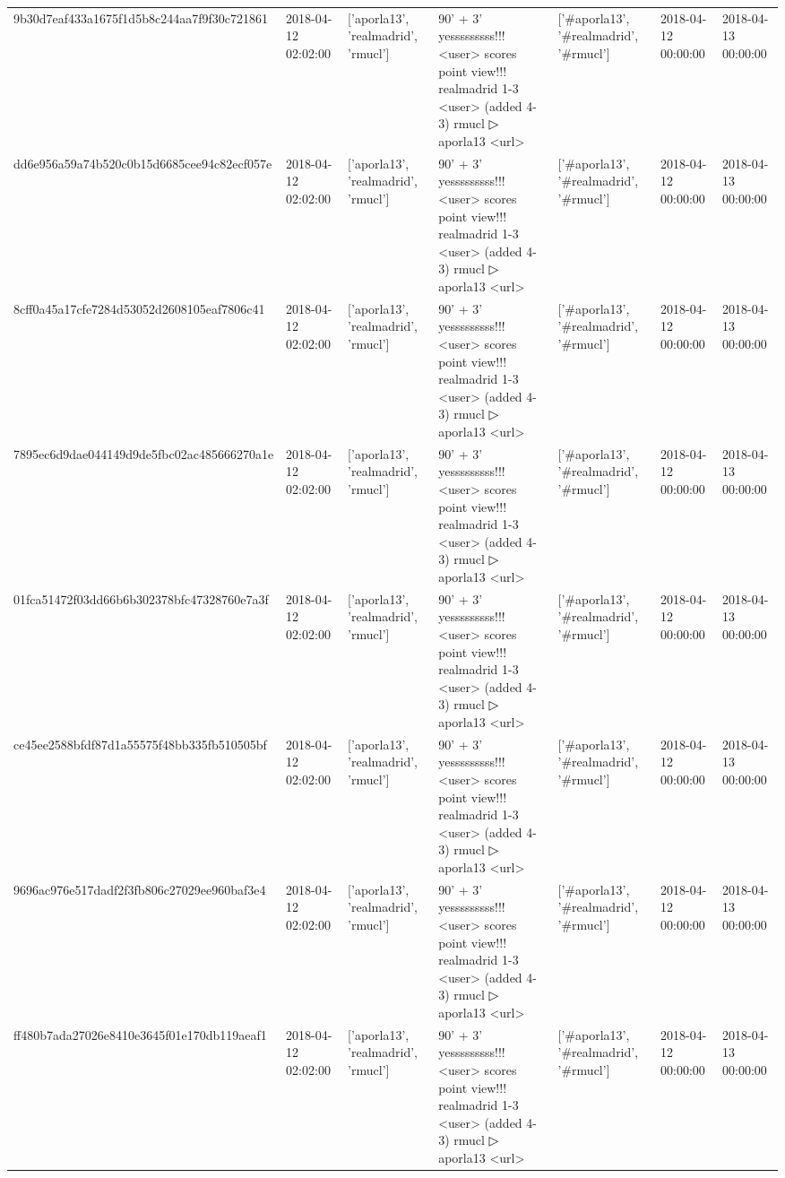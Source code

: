 \begin{tabular}{lllllll}
9b30d7eaf433a1675f1d5b8c244aa7f9f30c721861 & 2018-04-12 02:02:00 & ['aporla13', 'realmadrid', 'rmucl'] & 90' + 3' yesssssssss!!! <user> scores point view!!! realmadrid 1-3 <user> (added 4-3) rmucl ▷ aporla13 <url> & ['#aporla13', '#realmadrid', '#rmucl'] & 2018-04-12 00:00:00 & 2018-04-13 00:00:00 \\
dd6e956a59a74b520c0b15d6685cee94c82ecf057e & 2018-04-12 02:02:00 & ['aporla13', 'realmadrid', 'rmucl'] & 90' + 3' yesssssssss!!! <user> scores point view!!! realmadrid 1-3 <user> (added 4-3) rmucl ▷ aporla13 <url> & ['#aporla13', '#realmadrid', '#rmucl'] & 2018-04-12 00:00:00 & 2018-04-13 00:00:00 \\
8cff0a45a17cfe7284d53052d2608105eaf7806c41 & 2018-04-12 02:02:00 & ['aporla13', 'realmadrid', 'rmucl'] & 90' + 3' yesssssssss!!! <user> scores point view!!! realmadrid 1-3 <user> (added 4-3) rmucl ▷ aporla13 <url> & ['#aporla13', '#realmadrid', '#rmucl'] & 2018-04-12 00:00:00 & 2018-04-13 00:00:00 \\
7895ec6d9dae044149d9de5fbc02ac485666270a1e & 2018-04-12 02:02:00 & ['aporla13', 'realmadrid', 'rmucl'] & 90' + 3' yesssssssss!!! <user> scores point view!!! realmadrid 1-3 <user> (added 4-3) rmucl ▷ aporla13 <url> & ['#aporla13', '#realmadrid', '#rmucl'] & 2018-04-12 00:00:00 & 2018-04-13 00:00:00 \\
01fca51472f03dd66b6b302378bfc47328760e7a3f & 2018-04-12 02:02:00 & ['aporla13', 'realmadrid', 'rmucl'] & 90' + 3' yesssssssss!!! <user> scores point view!!! realmadrid 1-3 <user> (added 4-3) rmucl ▷ aporla13 <url> & ['#aporla13', '#realmadrid', '#rmucl'] & 2018-04-12 00:00:00 & 2018-04-13 00:00:00 \\
ce45ee2588bfdf87d1a55575f48bb335fb510505bf & 2018-04-12 02:02:00 & ['aporla13', 'realmadrid', 'rmucl'] & 90' + 3' yesssssssss!!! <user> scores point view!!! realmadrid 1-3 <user> (added 4-3) rmucl ▷ aporla13 <url> & ['#aporla13', '#realmadrid', '#rmucl'] & 2018-04-12 00:00:00 & 2018-04-13 00:00:00 \\
9696ac976e517dadf2f3fb806c27029ee960baf3e4 & 2018-04-12 02:02:00 & ['aporla13', 'realmadrid', 'rmucl'] & 90' + 3' yesssssssss!!! <user> scores point view!!! realmadrid 1-3 <user> (added 4-3) rmucl ▷ aporla13 <url> & ['#aporla13', '#realmadrid', '#rmucl'] & 2018-04-12 00:00:00 & 2018-04-13 00:00:00 \\
ff480b7ada27026e8410e3645f01e170db119aeaf1 & 2018-04-12 02:02:00 & ['aporla13', 'realmadrid', 'rmucl'] & 90' + 3' yesssssssss!!! <user> scores point view!!! realmadrid 1-3 <user> (added 4-3) rmucl ▷ aporla13 <url> & ['#aporla13', '#realmadrid', '#rmucl'] & 2018-04-12 00:00:00 & 2018-04-13 00:00:00 \\

\end{tabular}
